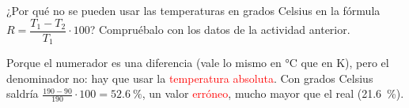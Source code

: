 \begin{exercise}
    ¿Por qué no se pueden usar las temperaturas en grados Celsius en la fórmula \(R = \dfrac{T_1 - T_2}{T_1} \cdot 100\)? Compruébalo con los datos de la actividad anterior.
    \begin{solu}
        Porque el numerador es una diferencia (vale lo mismo en \unit{\degreeCelsius} que en \unit{\kelvin}), pero el denominador no: hay que usar la \textcolor{red}{temperatura absoluta}. Con grados Celsius saldría \(\frac{190 - 90}{190} \cdot 100 = \qty{52.6}{\percent}\), un valor \textcolor{red}{erróneo}, mucho mayor que el real (\qty{21.6}{\percent}).
    \end{solu}
\end{exercise}
